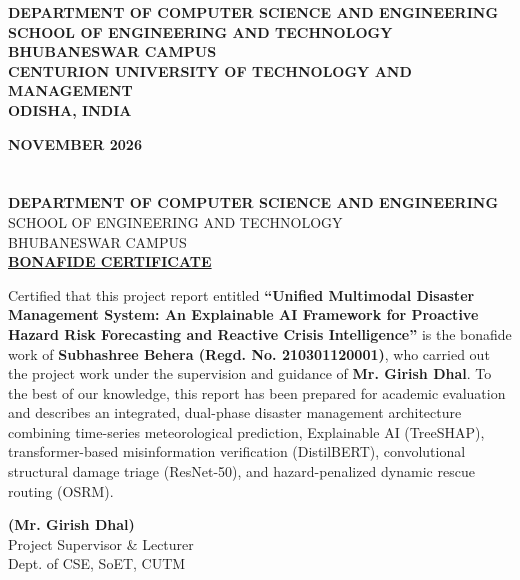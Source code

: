 \documentclass{article}
\begin{document}
\begin{titlepage}
\begin{center}
    {\large \textbf{DEPARTMENT OF COMPUTER SCIENCE AND ENGINEERING}\\
    \textbf{SCHOOL OF ENGINEERING AND TECHNOLOGY}\\
    \textbf{BHUBANESWAR CAMPUS}\\[0.3cm]
    \textbf{CENTURION UNIVERSITY OF TECHNOLOGY AND MANAGEMENT\\
    ODISHA, INDIA}\par}
    \vspace{0.4cm}
    {\large \textbf{NOVEMBER 2026}}
\end{center}
\end{titlepage}

\newpage
\section*{}
\begin{center}
\huge{\textbf{DEPARTMENT OF COMPUTER SCIENCE AND ENGINEERING}}\\[0.3cm]
\normalsize
\textsc{SCHOOL OF ENGINEERING AND TECHNOLOGY\\
BHUBANESWAR CAMPUS}\\[1.5cm]
\underline{\LARGE \textbf{BONAFIDE CERTIFICATE}}\\[0.8cm]
\end{center}
\normalsize
Certified that this project report entitled \textbf{``Unified Multimodal Disaster Management System: An Explainable AI Framework for Proactive Hazard Risk Forecasting and Reactive Crisis Intelligence''} is the bonafide work of \textbf{Subhashree Behera (Regd. No. 210301120001)}, who carried out the project work under the supervision and guidance of \textbf{Mr. Girish Dhal}. To the best of our knowledge, this report has been prepared for academic evaluation and describes an integrated, dual-phase disaster management architecture combining time-series meteorological prediction, Explainable AI (TreeSHAP), transformer-based misinformation verification (DistilBERT), convolutional structural damage triage (ResNet-50), and hazard-penalized dynamic rescue routing (OSRM).\\[1.2cm]

\begin{flushright}
\textbf{(Mr. Girish Dhal)}\\
Project Supervisor \& Lecturer\\
Dept. of CSE, SoET, CUTM\\[1.2cm]
\end{flushright}
\end{document}
